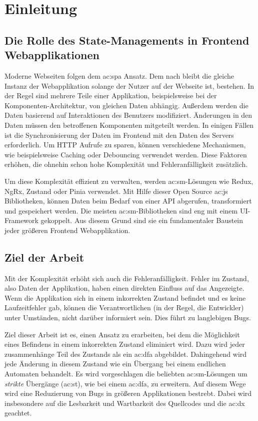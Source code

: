 \chapter{Einleitung}

\section{Die Rolle des State-Managements in Frontend Webapplikationen}

Moderne Webseiten folgen dem \acrlong{ac:spa} Ansatz. Dem nach bleibt die gleiche Instanz der Webapplikation solange der Nutzer auf der Webseite ist, bestehen. In der Regel sind mehrere Teile einer Applikation, beispielsweise bei der Komponenten-Architektur, von gleichen Daten abhängig. Außerdem werden die Daten basierend auf Interaktionen des Benutzers modifiziert. Änderungen in den Daten müssen den betroffenen Komponenten mitgeteilt werden. In einigen Fällen ist die Synchronisierung der Daten im Frontend mit den Daten des Servers erforderlich. Um HTTP Aufrufe zu sparen, können verschiedene Mechanismen, wie beispielsweise Caching oder Debouncing verwendet werden. Diese Faktoren erhöhen, die ohnehin schon hohe Komplexität und Fehleranfälligkeit zusätzlich.

Um diese Komplexität effizient zu verwalten, werden \acrlong{ac:sm}-Lösungen wie Redux, NgRx, Zustand oder Pinia verwendet. Mit Hilfe dieser Open Source \acrlong{ac:js} Bibliotheken, können Daten beim Bedarf von einer API abgerufen, transformiert und gespeichert werden. Die meisten \acrlong{ac:sm}-Bibliotheken sind eng mit einem UI-Framework gekoppelt. Aus diesem Grund sind sie ein fundamentaler Baustein jeder größeren Frontend Webapplikation.

\section{Ziel der Arbeit}

Mit der Komplexität erhöht sich auch die Fehleranfälligkeit. Fehler im Zustand, also Daten der Applikation, haben einen direkten Einfluss auf das Angezeigte. Wenn die Applikation sich in einem inkorrekten Zustand befindet und es keine Laufzeitfehler gab, können die Verantwortlichen (in der Regel, die Entwickler) unter Umständen, nicht darüber informiert sein. Dies führt zu langlebigen Bugs.

Ziel dieser Arbeit ist es, einen Ansatz zu erarbeiten, bei dem die Möglichkeit eines Befindens in einem inkorrekten Zustand eliminiert wird. Dazu wird jeder zusammenhänge Teil des Zustands als ein \acrlong{ac:dfa} abgebildet. Dahingehend wird jede Änderung in diesem Zustand wie ein Übergang bei einem endlichen Automaten behandelt. Es wird vorgeschlagen die beliebten \acrlong{ac:sm}-Lösungen um \textit{strikte} Übergänge (\acrshort{ac:st}), wie bei einem \acrlong{ac:dfa}, zu erweitern. Auf diesem Wege wird eine Reduzierung von Bugs in größeren Applikationen bestrebt. Dabei wird insbesondere auf die Lesbarkeit und Wartbarkeit des Quellcodes und die \acrlong{ac:dx} geachtet.

